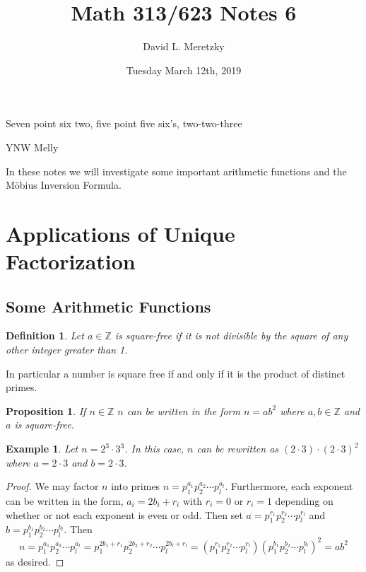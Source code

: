 \documentclass{article}
\title{ \vspace{-10ex} %
Math 313/623 Notes 6
}
\author{David L. Meretzky
}
\date{%
Tuesday March 12th, 2019
}
\theoremstyle{problemstyle}
\newtheorem{example}{Example}
\newtheorem{proposition}{Proposition}
\newtheorem{definition}{Definition}
\begin{document}
\maketitle

\epigraph{Seven point six two, five point five six's, two-two-three}{YNW Melly}

In these notes we will investigate some important arithmetic functions and the M\"obius Inversion Formula. 

\section*{Applications of Unique Factorization}

\subsection*{Some Arithmetic Functions}

\begin{definition}
Let $a \in \mathbb{Z}$ is square-free if it is not divisible by the square of any other integer greater than 1. 
\end{definition}

In particular a number is square free if and only if it is the product of distinct primes. 

\begin{proposition}
If $n \in \mathbb{Z}$ $n$ can be written in the form $n = ab^2$ where $a,b \in \mathbb{Z}$ and $a$ is square-free.  
\end{proposition}

\begin{example}
Let $n = 2^3\cdot3^3$. In this case, $n$ can be rewritten as $(2\cdot 3)\cdot(2\cdot 3)^2$ where $a = 2\cdot 3$ and $b = 2\cdot 3$.  
\end{example}

\begin{proof}
We may factor $n$ into primes $n = p_1^{a_1}p_2^{a_2}\cdots p_l^{a_l}$. Furthermore, each exponent can be written in the form, $a_i = 2b_i+r_i$ with $r_i = 0$ or $r_i = 1$ depending on whether or not each exponent is even or odd. Then set $a = p_1^{r_1}p_2^{r_2}\cdots p_l^{r_l}$ and $b = p_1^{b_1}p_2^{b_2}\cdots p_l^{b_l}$. Then $$n = p_1^{a_1}p_2^{a_2}\cdots p_l^{a_l} = p_1^{2b_1+r_1}p_2^{2b_2+r_2}\cdots p_l^{2b_l+r_l} = (p_1^{r_1}p_2^{r_2}\cdots p_l^{r_l})(p_1^{b_1}p_2^{b_2}\cdots p_l^{b_l})^2 = ab^2$$ as desired. 
\end{proof}
\end{document}
